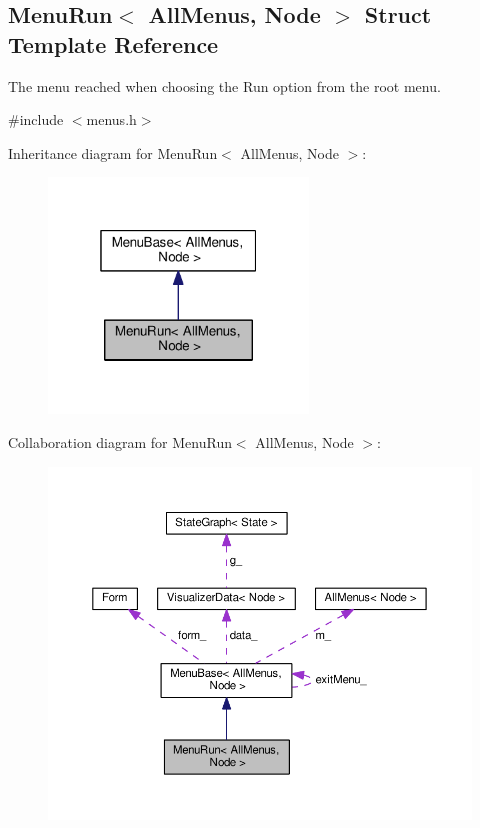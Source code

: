 \hypertarget{structMenuRun}{}\subsection{Menu\+Run$<$ All\+Menus, Node $>$ Struct Template Reference}
\label{structMenuRun}


The menu reached when choosing the Run option from the root menu.  




{\ttfamily \#include $<$menus.\+h$>$}



Inheritance diagram for Menu\+Run$<$ All\+Menus, Node $>$\+:\nopagebreak
\begin{figure}[H]
\begin{center}
\leavevmode
\includegraphics[width=196pt]{structMenuRun__inherit__graph}
\end{center}
\end{figure}


Collaboration diagram for Menu\+Run$<$ All\+Menus, Node $>$\+:\nopagebreak
\begin{figure}[H]
\begin{center}
\leavevmode
\includegraphics[width=350pt]{structMenuRun__coll__graph}
\end{center}
\end{figure}
